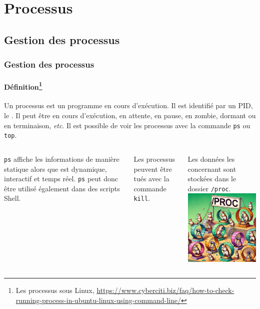 \documentclass{beamer}
\begin{document}
    \section{Processus}\label{sec:processus}

    \subsection{Gestion des processus}\label{subsec:process-management}

    \begin{frame}
        \transdissolve
        \frametitle{Gestion des processus}
        \framesubtitle{Définition\footnote{\label{process}Les processus sous Linux, \url{https://www.cyberciti.biz/faq/how-to-check-running-process-in-ubuntu-linux-using-command-line/}}}
        Un processus est un programme en cours d'exécution.
        Il est identifié par un PID, le .
        \bigbreak
        Il peut être en cours d'exécution, en attente, en pause, en zombie, dormant ou en terminaison, \textit{etc}.
        Il est possible de voir les processus avec la commande \lstinline{ps} ou \lstinline{top}.
        \bigbreak
        \begin{columns}
            \lstinline{ps} affiche les informations de manière statique alors que est dynamique, interactif et temps réel.
            \lstinline{ps} peut donc être utilisé également dans des scripts Shell.

            Les processus peuvent être tués avec la commande \lstinline{kill}.

            Les données les concernant sont stockées dans le dossier \lstinline{/proc}.
            \centering
            \includegraphics[width=4cm]{image/proc-hamster}
        \end{columns}
    \end{frame}
\end{document}
